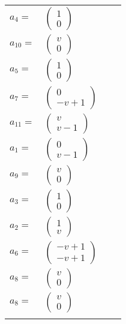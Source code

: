 \documentclass[1p]{elsarticle_modified}
\theoremstyle{definition}
\begin{document}
\begin{tabular}{m{7pt} m{180pt} m{7pt} m{180pt} }
\flushright $a_{4}=$&$\begin{pmatrix}1\\0\end{pmatrix}$ \\
\flushright $a_{10}=$&$\begin{pmatrix}v\\0\end{pmatrix}$ \\
\flushright $a_{5}=$&$\begin{pmatrix}1\\0\end{pmatrix}$ \\
\flushright $a_{7}=$&$\begin{pmatrix}0\\- v+1\end{pmatrix}$ \\
\flushright $a_{11}=$&$\begin{pmatrix}v\\v-1\end{pmatrix}$ \\
\flushright $a_{1}=$&$\begin{pmatrix}0\\v-1\end{pmatrix}$ \\
\flushright $a_{9}=$&$\begin{pmatrix}v\\0\end{pmatrix}$ \\
\flushright $a_{3}=$&$\begin{pmatrix}1\\0\end{pmatrix}$ \\
\flushright $a_{2}=$&$\begin{pmatrix}1\\v\end{pmatrix}$ \\
\flushright $a_{6}=$&$\begin{pmatrix}- v+1\\- v+1\end{pmatrix}$ \\
\flushright $a_{8}=$&$\begin{pmatrix}v\\0\end{pmatrix}$\\ \flushright $a_{8}=$&$\begin{pmatrix}v\\0\end{pmatrix}$\\&\end{tabular}
\end{document}
